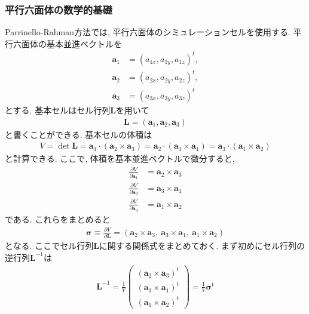 \subsubsection{平行六面体の数学的基礎}
Parrinello-Rahman方法では, 平行六面体のシミュレーションセルを使用する.
平行六面体の基本並進ベクトルを
\begin{align}
  \bm{a}_{1} &= (a_{1x}, a_{1y}, a_{1z})^{t}, \\
  \bm{a}_{2} &= (a_{2x}, a_{2y}, a_{2z})^{t}, \\
  \bm{a}_{3} &= (a_{3x}, a_{3y}, a_{3z})^{t}
\end{align}
とする. 基本セルはセル行列$\bm{L}$を用いて
\begin{align}
  \bm{L} = (\bm{a}_{1}, \bm{a}_{2}, \bm{a}_{3})
\end{align}
と書くことができる. 基本セルの体積は
\begin{align}
  V
   = \det \bm{L}
   = \bm{a}_{1} \cdot (\bm{a}_{2} \times \bm{a}_{3})
   = \bm{a}_{2} \cdot (\bm{a}_{3} \times \bm{a}_{1})
   = \bm{a}_{3} \cdot (\bm{a}_{1} \times \bm{a}_{2})
\end{align}
と計算できる. ここで, 体積を基本並進ベクトルで微分すると,
\begin{align}
  \frac{\partial V}{\partial \bm{a}_{1}}
  &=
  \bm{a}_{2} \times \bm{a}_{3}
  \\
  \frac{\partial V}{\partial \bm{a}_{2}}
  &=
  \bm{a}_{3} \times \bm{a}_{1}
  \\
  \frac{\partial V}{\partial \bm{a}_{3}}
  &=
  \bm{a}_{1} \times \bm{a}_{2}
\end{align}
である. これらをまとめると
\begin{align}
  \bm{\sigma}
  \equiv
  \frac{\partial V}{\partial \bm{L}}
  =
  \left(
    \bm{a}_{2} \times \bm{a}_{3},~
    \bm{a}_{3} \times \bm{a}_{1},~
    \bm{a}_{1} \times \bm{a}_{2}
  \right)
  \label{Eq:def-sigma}
\end{align}
となる. ここでセル行列$\bm{L}$に関する関係式をまとめておく. まず初めにセル行列の逆行列$\bm{L}^{-1}$は
\begin{align}
  \bm{L}^{-1}
  =
  \frac{1}{V}
  \begin{pmatrix}
    (\bm{a}_{2} \times \bm{a}_{3})^{\mathrm{t}} \\
    (\bm{a}_{3} \times \bm{a}_{1})^{\mathrm{t}} \\
    (\bm{a}_{1} \times \bm{a}_{2})^{\mathrm{t}}
  \end{pmatrix}
  =
  \frac{1}{V} \bm{\sigma}^{\mathrm{t}}
  \label{Eq:inv-cell-matrix}
\end{align}
